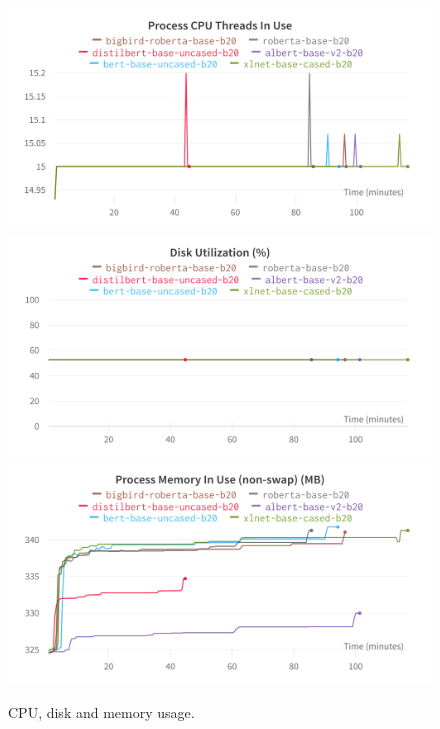 \documentclass[conference]{IEEEtran}
\begin{document}
\begin{appendices}
\begin{figure}[htp]
    \centering
    \includegraphics[scale=0.17]{cpu_use.png}
    \includegraphics[scale=0.17]{disk_util.png}
    \includegraphics[scale=0.17]{memory_used.png}
    \caption{CPU, disk and memory usage.}
    \label{fig:cpu_disk_memory}
\end{figure}


\end{appendices}
\end{document}
